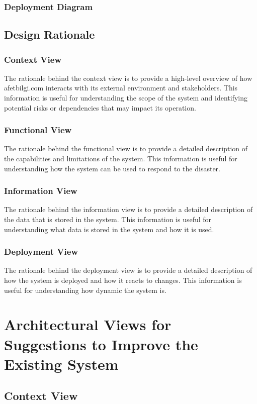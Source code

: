 \documentclass[a4paper]{article}
\begin{document}
    \subsubsection{Deployment Diagram}
    \subsection{Design Rationale}
    \subsubsection{Context View}
    The rationale behind the context view is to provide a high-level overview of how afetbilgi.com interacts with its external
    environment and stakeholders. This information is useful for understanding the scope of the system and identifying potential
    risks or dependencies that may impact its operation.
    \subsubsection{Functional View}
    The rationale behind the functional view is to provide a detailed description of the capabilities and limitations of the
    system. This information is useful for understanding how the system can be used to respond to the disaster.
    \subsubsection{Information View}
    The rationale behind the information view is to provide a detailed description of the data that is stored in the system.
    This information is useful for understanding what data is stored in the system and how it is used.
    \subsubsection{Deployment View}
    The rationale behind the deployment view is to provide a detailed description of how the system is deployed and how it reacts
    to changes. This information is useful for understanding how dynamic the system is.

    \section{Architectural Views for Suggestions to Improve the Existing System}
    \subsection{Context View}
\end{document}
